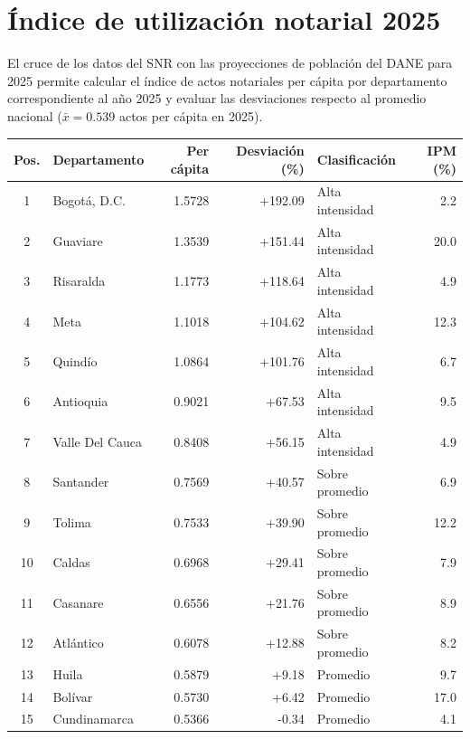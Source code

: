 \documentclass{article}
\begin{document}
\section{Índice de utilización notarial 2025}

El cruce de los datos del SNR con las proyecciones 
de población del DANE para 2025 permite calcular 
el índice de actos notariales per cápita por
departamento correspondiente al año 2025 y evaluar
las desviaciones respecto al promedio nacional
($\bar{x} = 0.539$ actos per cápita en 2025).

\begin{table}[H]
\centering
\small
\begin{tabular}{clrrl r}
\toprule
\textbf{Pos.} & \textbf{Departamento} & 
\textbf{Per cápita} & \textbf{Desviación (\%)} & 
\textbf{Clasificación} & \textbf{IPM (\%)} \\
\midrule
1  & Bogotá, D.C.        & 1.5728 & +192.09 & Alta intensidad &  2.2 \\
2  & Guaviare            & 1.3539 & +151.44 & Alta intensidad & 20.0 \\
3  & Risaralda           & 1.1773 & +118.64 & Alta intensidad &  4.9 \\
4  & Meta                & 1.1018 & +104.62 & Alta intensidad & 12.3 \\
5  & Quindío             & 1.0864 & +101.76 & Alta intensidad &  6.7 \\
6  & Antioquia           & 0.9021 &  +67.53 & Alta intensidad &  9.5 \\
7  & Valle Del Cauca     & 0.8408 &  +56.15 & Alta intensidad &  4.9 \\
8  & Santander           & 0.7569 &  +40.57 & Sobre promedio   &  6.9 \\
9  & Tolima              & 0.7533 &  +39.90 & Sobre promedio   & 12.2 \\
10 & Caldas              & 0.6968 &  +29.41 & Sobre promedio   &  7.9 \\
11 & Casanare            & 0.6556 &  +21.76 & Sobre promedio   &  8.9 \\
12 & Atlántico           & 0.6078 &  +12.88 & Sobre promedio   &  8.2 \\
13 & Huila               & 0.5879 &   +9.18 & Promedio         &  9.7 \\
14 & Bolívar             & 0.5730 &   +6.42 & Promedio         & 17.0 \\
15 & Cundinamarca        & 0.5366 &   -0.34 & Promedio         &  4.1 \\

\end{tabular}
\end{table}
\end{document}
